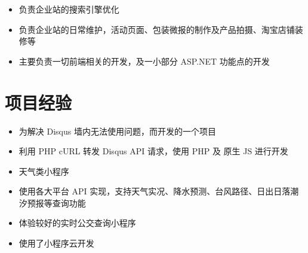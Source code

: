 \documentclass[12pt,a4paper]{moderncv}
\begin{document}
  {
    \begin{itemize}
    \item \small 负责企业站的搜索引擎优化
    \end{itemize}
  }

  {  
    \begin{itemize}
    \item \small 负责企业站的日常维护，活动页面、包装微报的制作及产品拍摄、淘宝店铺装修等
    \end{itemize}
  }

  {  
    \begin{itemize}
    \item \small 主要负责一切前端相关的开发，及一小部分 ASP.NET 功能点的开发
    \end{itemize}
  }

\section{\textbf {项目经验}}

  {  
    \begin{itemize}
    \item \small 为解决 Disqus 墙内无法使用问题，而开发的一个项目
    \item \small 利用 PHP cURL 转发 Disqus API 请求，使用 PHP 及 原生 JS 进行开发
    \end{itemize}
  }

  {  
    \begin{itemize}
    \item \small 天气类小程序
    \item \small 使用各大平台 API 实现，支持天气实况、降水预测、台风路径、日出日落潮汐预报等查询功能
    \end{itemize}
  }

  {  
    \begin{itemize}
    \item \small 体验较好的实时公交查询小程序
    \item \small 使用了小程序云开发
    \end{itemize}
  }
\end{document}
